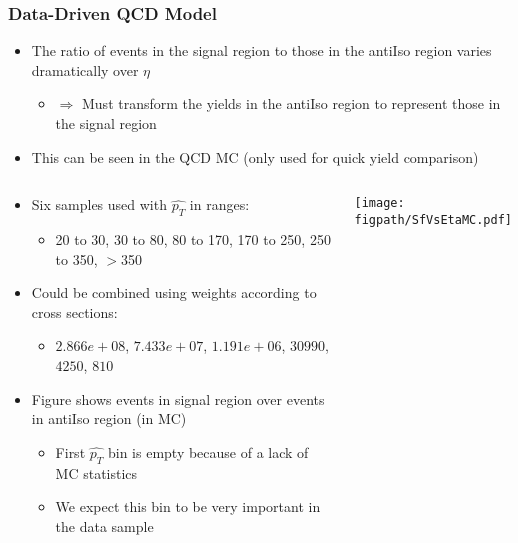 \begin{frame}
	\frametitle{Data-Driven QCD Model}
	\vspace*{-0.24cm}
	\begin{block}{}
		\begin{itemize}
			\footnotesize
			\item The ratio of events in the signal region to those in the antiIso region varies dramatically over $\eta$
			\begin{itemize}
				\scriptsize
				\item $\Rightarrow$ Must transform the yields in the antiIso region to represent those in the signal region
			\end{itemize}
			\item This can be seen in the QCD MC (only used for quick yield comparison)
		\end{itemize}
	\end{block}
	\setlength{\residualSpace}{\textwidth-0.62\textwidth}%
	\vspace*{-0.26cm}
	\begin{columns}[T]
		\column{\residualSpace}
			\vspace*{-0.20cm}
			\begin{block}{}
				\begin{itemize}
					\footnotesize
					\item Six samples used with $\hat{p_{T}}$ in ranges:
					\begin{itemize}
						\scriptsize
						\item 20 to 30, 30 to 80, 80 to 170, 170 to 250, 250 to 350, $>$350
					\end{itemize}
					\item Could be combined using weights according to cross sections:
					\begin{itemize}
						\scriptsize
						\item $2.866e+08$, $7.433e+07$, $1.191e+06$, $30990$, $4250$, $810$
					\end{itemize}
					\item Figure shows events in signal region over events in antiIso region (in MC)
					\begin{itemize}
						\scriptsize
						\item First $\hat{p_{T}}$ bin is empty because of a lack of MC statistics
						\item We expect this bin to be very important in the data sample
					\end{itemize}
				\end{itemize}
			\end{block}
			\vspace*{0.6cm}
			\texttt{[image: \\figpath/SfVsEtaMC.pdf]}
	\end{columns}
\end{frame}

